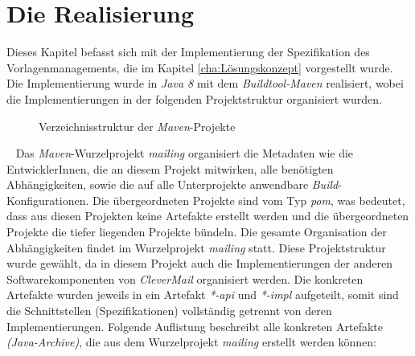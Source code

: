 \chapter{Die Realisierung}
\label{cha:Realisierung}
Dieses Kapitel befasst sich mit der Implementierung der Spezifikation des Vorlagenmanagements, die im Kapitel \ref{cha:Lösungskonzept} vorgestellt wurde. Die Implementierung wurde in \emph{Java 8} mit dem \emph{Buildtool-Maven} realisiert, wobei die Implementierungen in der folgenden Projektstruktur organisiert wurden.
\begin{figure}[h]
\caption{Verzeichnisstruktur der \emph{Maven}-Projekte}
\label{fig:minimal-example:frame-dirtree}
\end{figure}
\ \newline
Das \emph{Maven}-Wurzelprojekt \emph{mailing} organisiert die Metadaten wie die EntwicklerInnen, die an diesem Projekt mitwirken, alle benötigten Abhängigkeiten, sowie die auf alle Unterprojekte anwendbare \emph{Build}-Konfigurationen. Die übergeordneten Projekte sind vom Typ \emph{pom}, was bedeutet, dass aus diesen Projekten keine Artefakte erstellt werden und die übergeordneten Projekte die tiefer liegenden Projekte bündeln. Die gesamte Organisation der Abhängigkeiten findet im Wurzelprojekt \emph{mailing} statt. Diese Projektstruktur wurde gewählt, da in diesem Projekt auch die Implementierungen der anderen Softwarekomponenten von \emph{CleverMail} organisiert werden. Die konkreten Artefakte wurden jeweils in ein Artefakt \emph{*-api} und \emph{*-impl} aufgeteilt, somit sind die Schnittstellen (Spezifikationen) vollständig getrennt von deren Implementierungen. Folgende Auflistung beschreibt alle konkreten Artefakte \emph{(Java-Archive)}, die aus dem Wurzelprojekt \emph{mailing} erstellt werden können:
